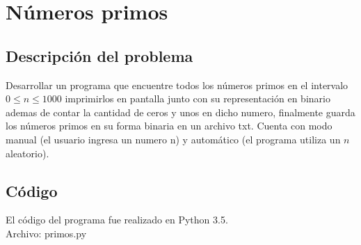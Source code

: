 \section{Números primos}
	\subsection{Descripción del problema}
	Desarrollar un programa que encuentre todos los números primos en el intervalo $0 \leq n \leq 1000$ imprimirlos en pantalla junto con su representación en binario ademas de contar la cantidad de ceros y unos en dicho numero, finalmente guarda los números primos en su forma binaria en un archivo txt.
	Cuenta con modo manual (el usuario ingresa un numero n) y automático (el programa utiliza un $n$ aleatorio).
	\subsection{Código}
	El código del programa fue realizado en Python 3.5.
	\\
	Archivo: primos.py
